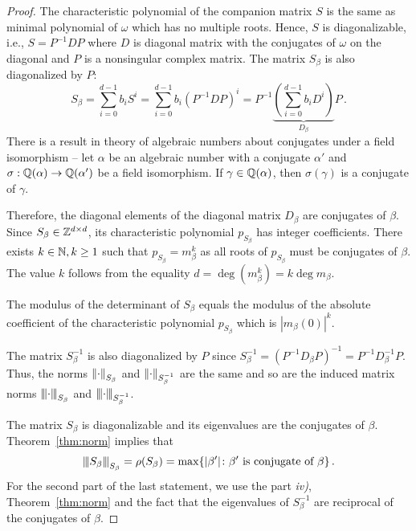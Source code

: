\begin{proof}
The characteristic polynomial of the companion matrix $S$ is the same as minimal polynomial of $\omega$ which has no multiple roots. Hence, $S$ is diagonalizable, i.e., $S=P^{-1}DP$ where $D$ is diagonal matrix with the conjugates of $\omega$ on the diagonal and $P$ is a nonsingular complex matrix. The matrix $S_\beta$ is also diagonalized by $P$:
$$
S_\beta=\sum_{i=0}^{d-1} b_i S^i= \sum_{i=0}^{d-1} b_i \left(P^{-1}DP\right)^i=P^{-1}\underbrace{\left(\sum_{i=0}^{d-1} b_i D^i\right)}_{D_\beta}P\,.
$$
There is a result in theory of algebraic numbers about conjugates under a field isomorphism -- let $\alpha$ be an algebraic number with a conjugate $\alpha'$ and $\sigma:\mathbb{Q}(\alpha)\rightarrow\mathbb{Q}(\alpha')$ be a field isomorphism. If $\gamma\in\mathbb{Q}(\alpha)$, then $\sigma(\gamma)$ is a conjugate of $\gamma$. 

Therefore, the diagonal elements of the diagonal matrix $D_\beta$ are conjugates of $\beta$. Since $S_\beta\in\mathbb{Z}^{d\times d}$, its characteristic polynomial $p_{S_\beta}$ has integer coefficients. There exists $k\in\mathbb{N}, k\geq 1$ such that $p_{S_\beta}=m^k_\beta$ as all roots of $p_{S_\beta}$ must be conjugates of $\beta$. The value $k$ follows from the equality $d=\deg(m_\beta^k)=k \deg m_\beta$. 

The modulus of the determinant of $S_\beta$ equals the modulus of the absolute coefficient of the characteristic polynomial $p_{S_\beta}$ which is $|m_\beta(0)|^k$.

The matrix $S_\beta^{-1}$ is also diagonalized by $P$ since $S_\beta^{-1}=(P^{-1}D_\beta P)^{-1}=P^{-1}D_\beta^{-1}P$. Thus, the norms $\left\lVert\cdot\right\rVert_{S_\beta}$ and $\left\lVert\cdot\right\rVert_{S_\beta^{-1}}$ are the same and so are the induced matrix norms ${\left\vert\kern-0.25ex\left\vert\kern-0.25ex\left\vert \cdot\right\vert\kern-0.25ex\right\vert\kern-0.25ex\right\vert}_{S_\beta}$ and ${\left\vert\kern-0.25ex\left\vert\kern-0.25ex\left\vert \cdot\right\vert\kern-0.25ex\right\vert\kern-0.25ex\right\vert}_{S_\beta^{-1}}$.

The matrix $S_\beta$ is diagonalizable and its eigenvalues are the conjugates of $\beta$. Theorem~\ref{thm:norm} implies that 
$$
{\left\vert\kern-0.25ex\left\vert\kern-0.25ex\left\vert S_\beta\right\vert\kern-0.25ex\right\vert\kern-0.25ex\right\vert}_{S_\beta}=\rho(S_\beta)= \max \{|\beta'| \colon \beta' \text{ is conjugate of } \beta\}\,. 
$$
For the second part of the last statement, we use the part \textit{iv)}, Theorem~\ref{thm:norm} and the fact that the eigenvalues of $S_\beta^{-1}$ are  reciprocal of the conjugates of $\beta$.
\end{proof}

